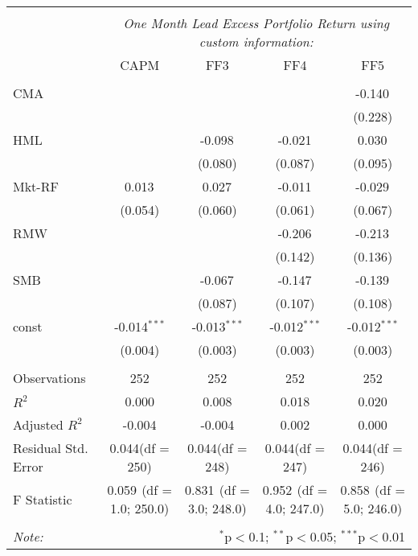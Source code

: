 \begin{table}[!htbp] \centering
\begin{tabular}{@{\extracolsep{5pt}}lcccc}
\\[-1.8ex]\hline
\hline \\[-1.8ex]
& \multicolumn{4}{c}{\textit{One Month Lead Excess Portfolio Return using custom information:}} \
\cr \cline{4-5}
\\[-1.8ex] & CAPM & FF3 & FF4 & FF5 \\
\hline \\[-1.8ex]
 CMA & & & & -0.140$^{}$ \\
  & & & & (0.228) \\
 HML & & -0.098$^{}$ & -0.021$^{}$ & 0.030$^{}$ \\
  & & (0.080) & (0.087) & (0.095) \\
 Mkt-RF & 0.013$^{}$ & 0.027$^{}$ & -0.011$^{}$ & -0.029$^{}$ \\
  & (0.054) & (0.060) & (0.061) & (0.067) \\
 RMW & & & -0.206$^{}$ & -0.213$^{}$ \\
  & & & (0.142) & (0.136) \\
 SMB & & -0.067$^{}$ & -0.147$^{}$ & -0.139$^{}$ \\
  & & (0.087) & (0.107) & (0.108) \\
 const & -0.014$^{***}$ & -0.013$^{***}$ & -0.012$^{***}$ & -0.012$^{***}$ \\
  & (0.004) & (0.003) & (0.003) & (0.003) \\
\hline \\[-1.8ex]
 Observations & 252 & 252 & 252 & 252 \\
 $R^2$ & 0.000 & 0.008 & 0.018 & 0.020 \\
 Adjusted $R^2$ & -0.004 & -0.004 & 0.002 & 0.000 \\
 Residual Std. Error & 0.044(df = 250) & 0.044(df = 248) & 0.044(df = 247) & 0.044(df = 246)  \\
 F Statistic & 0.059$^{}$ (df = 1.0; 250.0) & 0.831$^{}$ (df = 3.0; 248.0) & 0.952$^{}$ (df = 4.0; 247.0) & 0.858$^{}$ (df = 5.0; 246.0) \\
\hline
\hline \\[-1.8ex]
\textit{Note:} & \multicolumn{4}{r}{$^{*}$p$<$0.1; $^{**}$p$<$0.05; $^{***}$p$<$0.01} \\
\end{tabular}
\end{table}
